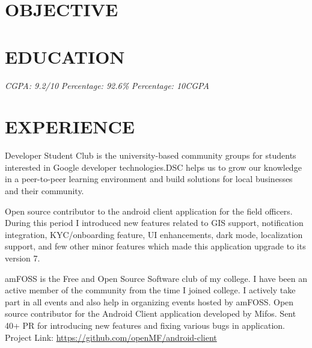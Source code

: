 \documentclass[11pt,a4paper,sans]{moderncv}        %
\begin{document}
\makecvtitle

\section{OBJECTIVE}

\section{EDUCATION}
{\textit{CGPA: 9.2/10}}{}  %
{\textit{Percentage: 92.6\%  }}{}  %
{\textit{Percentage: 10CGPA  }}{}  %

\section{EXPERIENCE}

{Developer Student Club is the university-based community groups for students interested in Google developer technologies.DSC helps us to grow our knowledge in a peer-to-peer learning environment and build solutions for local businesses and their community.}

{Open source contributor to the android client application for the field officers. During this period I introduced new features related to GIS support, notification integration, KYC/onboarding feature, UI enhancements, dark mode, localization support, and few other minor features which made this application upgrade to its version 7.}

{amFOSS is the Free and Open Source Software club of my college. I have been an active member of the community from the time I joined college. I actively take part in all events and also help in organizing events hosted by amFOSS.}
{ Open source contributor for the Android Client application developed by Mifos. Sent 40+ PR for introducing new features and fixing various bugs in application. Project Link: {\newline} 
\url{https://github.com/openMF/android-client}}{}  %
\end{document}
